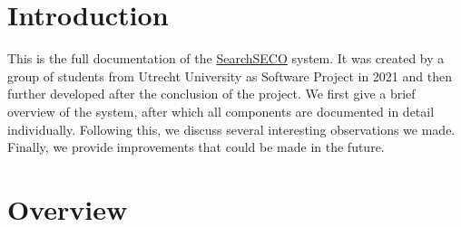 \documentclass{article}
\begin{document}


\restoregeometry

\section{Introduction}
This is the full documentation of the \href{https://github.com/orgs/SecureSECO/teams/searchseco/repositories}{SearchSECO} system. It was created by a group of students from Utrecht University as Software Project in 2021 and then further developed after the conclusion of the project. We first give a brief overview of the system, after which all components are documented in detail individually. Following this, we discuss several interesting observations we made. Finally, we provide improvements that could be made in the future.\\




\clearpage
\tableofcontents
\clearpage

\section{Overview}
\end{document}
